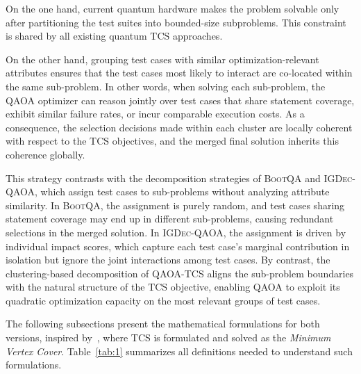 On the one hand, current quantum hardware makes the problem solvable only after partitioning the test suites into bounded-size subproblems. This constraint is shared by all existing quantum TCS approaches.

On the other hand, grouping test cases with similar optimization-relevant attributes ensures that the test cases most likely to interact are co-located within the same sub-problem. In other words, when solving each sub-problem, the QAOA optimizer can reason jointly over test cases that share statement coverage, exhibit similar failure rates, or incur comparable execution costs. As a consequence, the selection decisions made within each cluster are locally coherent with respect to the TCS objectives, and the merged final solution inherits this coherence globally.

This strategy contrasts with the decomposition strategies of \textsc{BootQA} and \textsc{IGDec-QAOA}, which assign test cases to sub-problems without analyzing attribute similarity. In \textsc{BootQA}, the assignment is purely random, and test cases sharing statement coverage may end up in different sub-problems, causing redundant selections in the merged solution. In \textsc{IGDec-QAOA}, the assignment is driven by individual impact scores, which capture each test case's marginal contribution in isolation but ignore the joint interactions among test cases. By contrast, the clustering-based decomposition of \textsc{QAOA-TCS} aligns the sub-problem boundaries with the natural structure of the TCS objective, enabling QAOA to exploit its quadratic optimization capacity on the most relevant groups of test cases.

The following subsections present the mathematical formulations for both versions, inspired by~\cite{serrano2024incident}, where TCS is formulated and solved as the \textit{Minimum Vertex Cover}. Table~\ref{tab:1} summarizes all definitions needed to understand such formulations.

